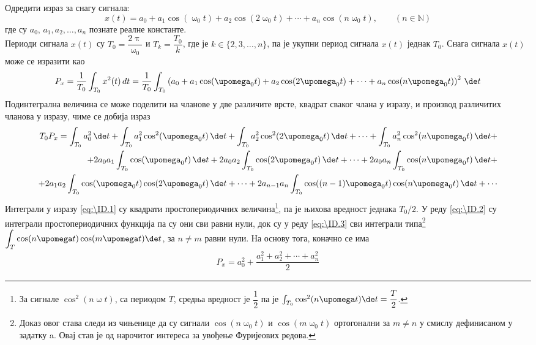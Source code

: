 \noindent 
\PID\mnImportant \label{z:snaga_harm}
Одредити израз за снагу сигнала: 
$$
x(t) = a_0 + a_1\cos(\upomega_0 t) +
a_2 \cos(2\upomega_0 t) + \cdots 
+ a_n \cos(n\upomega_0 t), \qquad (n\in\mathbb N)
$$
где су $a_0$, $a_1, a_2, \ldots, a_n$ познате реалне
константе.
\\[2mm]

\RESENJE 
Периоди сигнала $x(t)$ су $T_0 = \dfrac{2\uppi}{\upomega_0}$ и $T_k = \dfrac{T_0}{k}$, где је $k \in \{2,3,\ldots,n\}$, 
па је укупни период сигнала $x(t)$ једнак $T_0$. Снага сигнала $x(t)$ може се изразити као 
\begin{equation}
P_x = \dfrac{1}{T_0}\int_{T_0} x^2(t) \, dt =  \dfrac{1}{T_0} \int_{T_0} \left( a_0 + a_1\cos(\upomega_0 t) +
a_2 \cos(2\upomega_0 t) + \cdots
+ a_n \cos(n\upomega_0 t) \right)^2 \, \de t \\
\end{equation}
Подинтегрална величина се може поделити на чланове у две различите врсте, квадрат сваког члана у изразу, и производ различитих
чланова у изразу, чиме се добија израз
\begin{eqnarray}
T_0 P_x = \int_{T_0} a_0^2 \, \de t + \int_{T_0} a_1^2\cos^2(\upomega_0 t) \, \de t   \label{eq:\ID.1}
+ \int_{T_0} a_2^2 \cos^2(2\upomega_0 t) \, \de t + \cdots + \int_{T_0} a_n^2 \cos^2(n\upomega_0 t) \, \de t + \\
+ 2a_0a_1\int_{T_0} \cos(\upomega_0 t) \, \de t + 
2a_0a_2\int_{T_0} \cos(2\upomega_0 t) \, \de t + \cdots + \label{eq:\ID.2}
2a_0a_n\int_{T_0} \cos(n\upomega_0 t) \, \de t + \\
+ 2a_1a_2\int_{T_0} \cos(\upomega_0 t)\cos(2\upomega_0 t) \, \de t + \cdots + 
2a_{n-1}a_n\int_{T_0} \cos((n-1)\upomega_0 t)\cos(n\upomega_0 t) \, \de t + \cdots   \label{eq:\ID.3}
\end{eqnarray}
Интеграли у изразу \eqref{eq:\ID.1} су квадрати простопериодичних величина\footnote{
За сигнале $\cos^2(n\upomega t)$, са периодом $T$, средња вредност је $\dfrac{1}{2}$ па је 
$\int_{T_0} \cos^2(n\upomega t) \de t = \dfrac{T}{2}$.
}, па је њихова вредност једнака $T_0/2$. У реду \eqref{eq:\ID.2} су интеграли 
простопериодичних функција па су они сви равни нули, док су у реду \eqref{eq:\ID.3} сви интеграли 
типа\footnote{
    Доказ овог става следи из чињенице да су сигнали $\cos(n \upomega_0 t)$ и $\cos(m \upomega_0 t)$
    ортогонални за $m \neq n$ у смислу дефинисаном у задатку a. Овај став је од 
    нарочитог интереса за увођење Фуријеових редова.
}
$\displaystyle\int_T \cos(n\upomega t) \cos(m\upomega t) \de t$, за $n \neq m$ равни нули. На основу тога, 
коначно се има
\begin{eqnarray}
    P_x = a_0^2 + \dfrac{ a_1^2 + a_2^2 + \cdots + a_n^2 }{2}
\end{eqnarray}

